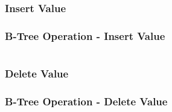 \documentclass{beamer}
\begin{document}
\begin{frame}
    \subsubsection{Insert Value}
    \frametitle{B-Tree Operation - Insert Value}
    \begin{columns}
        \begin{column}{\textlecolumn}
            \begin{block}{}
                \begin{itemize}
                \end{itemize}
            \end{block}
        \end{column}
        \begin{column}{\textricolumn}
        \end{column}
    \end{columns}
\end{frame}
\begin{frame}
    \subsubsection{Delete Value}
    \frametitle{B-Tree Operation - Delete Value}
\end{frame}
\end{document}
